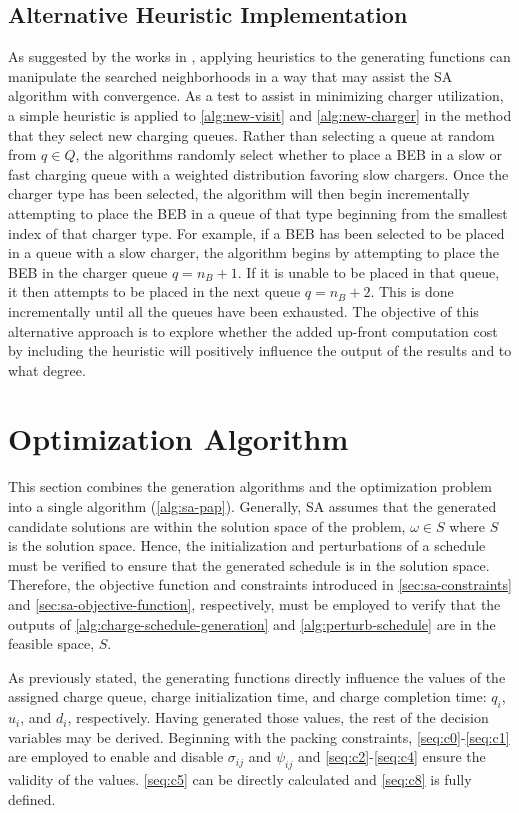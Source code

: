 \documentclass[energies,article,submit,moreauthors]{Definitions/mdpi}
\begin{document}
\subsection{Alternative Heuristic Implementation}
\label{sec:sa-heuristic-implementation}
As suggested by the works in \cite{Zhang_2010,Xinchao_2011}, applying heuristics to the generating functions can
manipulate the searched neighborhoods in a way that may assist the SA algorithm with convergence. As a test to assist in
minimizing charger utilization, a simple heuristic is applied to \ref{alg:new-visit} and \ref{alg:new-charger} in the
method that they select new charging queues. Rather than selecting a queue at random from \(q \in Q\), the algorithms
randomly select whether to place a BEB in a slow or fast charging queue with a weighted distribution favoring slow
chargers. Once the charger type has been selected, the algorithm will then begin incrementally attempting to place the
BEB in a queue of that type beginning from the smallest index of that charger type. For example, if a BEB has been
selected to be placed in a queue with a slow charger, the algorithm begins by attempting to place the BEB in the charger
queue \(q = n_B + 1\). If it is unable to be placed in that queue, it then attempts to be placed in the next queue \(q =
n_B + 2\). This is done incrementally until all the queues have been exhausted. The objective of this alternative
approach is to explore whether the added up-front computation cost by including the heuristic will positively influence
the output of the results and to what degree.
\section{Optimization Algorithm}
\label{sec:sa-optimization-algorithm}
This section combines the generation algorithms and the optimization problem into a single algorithm (\ref{alg:sa-pap}).
Generally, SA assumes that the generated candidate solutions are within the solution space of the problem, \(\omega \in S\) where
\(S\) is the solution space. Hence, the initialization and perturbations of a schedule must be verified to ensure that the
generated schedule is in the solution space. Therefore, the objective function and constraints introduced in
\ref{sec:sa-constraints} and \ref{sec:sa-objective-function}, respectively, must be employed to verify that the outputs of
\ref{alg:charge-schedule-generation} and \ref{alg:perturb-schedule} are in the feasible space, \(S\).

As previously stated, the generating functions directly influence the values of the assigned charge queue, charge
initialization time, and charge completion time: \(q_i\), \(u_i\), and \(d_i\), respectively. Having generated those values,
the rest of the decision variables may be derived. Beginning with the packing constraints, \ref{seq:c0}-\ref{seq:c1} are
employed to enable and disable \(\sigma_{ij}\) and \(\psi_{ij}\) and \ref{seq:c2}-\ref{seq:c4} ensure the validity of the values.
\ref{seq:c5} can be directly calculated and \ref{seq:c8} is fully defined.
\end{document}
